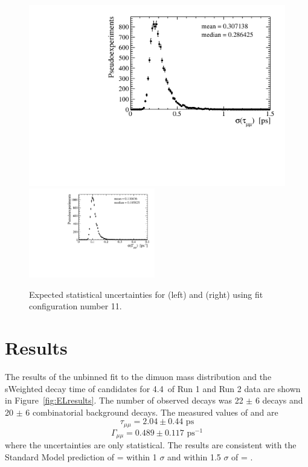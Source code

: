 {\begin{figure}[htbp]
    \centering
        \includegraphics[width=0.49 \textwidth]{./Figs/LifetimeMeasurement/5320-6000_tau_err.pdf}
        \includegraphics[width=0.49\textwidth]{./Figs/LifetimeMeasurement/5320-6000_gamma_err.pdf}

    \caption{Expected statistical uncertainties for \tmumu (left) and \Gmumu (right) using fit configuration number 11.}
    \label{fig:exptuncert}
\end{figure}


\section{Results}
\label{sec:ELresults}

The results of the unbinned \ml fit to the dimuon mass distribution and the sWeighted decay time of \bsmumu candidates for 4.4~\fb of Run 1 and Run 2 data are shown in Figure~\ref{fig:ELresults}. The number of observed decays was 22 $\pm$ 6 \bsmumu decays and 20 $\pm$ 6 combinatorial background decays. The measured values of \tmumu and \Gmumu are
\begin{equation}
\tau_{\mu\mu} = 2.04 \pm 0.44  \text{ ps} 
\end{equation}
\begin{equation}
\Gamma_{\mu\mu} = 0.489  \pm 0.117 \text{ ps}^{-1}
\end{equation}
where the uncertainties are only statistical. The results are consistent with the Standard Model prediction of \tmumu = \tH within  1 $\sigma$ and within  1.5 $\sigma$ of \tmumu = \tL.


}
